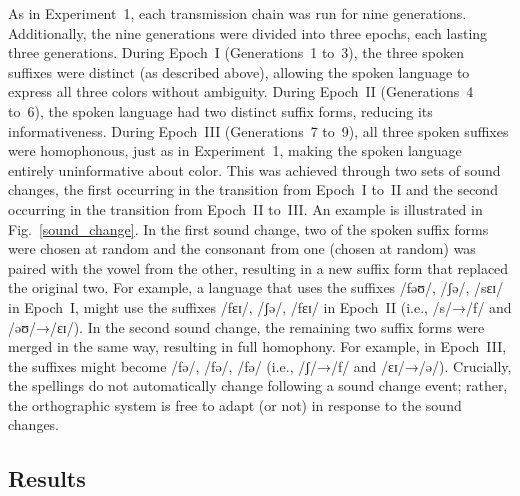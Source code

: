 \documentclass[doc,biblatex]{apa7}
\begin{document}
As in Experiment~1, each transmission chain was run for nine generations. Additionally, the nine generations were divided into three epochs, each lasting three generations. During Epoch~I (Generations~1 to~3), the three spoken suffixes were distinct (as described above), allowing the spoken language to express all three colors without ambiguity. During Epoch~II (Generations~4 to~6), the spoken language had two distinct suffix forms, reducing its informativeness. During Epoch~III (Generations~7 to~9), all three spoken suffixes were homophonous, just as in Experiment~1, making the spoken language entirely uninformative about color. This was achieved through two sets of sound changes, the first occurring in the transition from Epoch~I to~II and the second occurring in the transition from Epoch~II to~III. An example is illustrated in Fig.~\ref{sound_change}. In the first sound change, two of the spoken suffix forms were chosen at random and the consonant from one (chosen at random) was paired with the vowel from the other, resulting in a new suffix form that replaced the original two. For example, a language that uses the suffixes /fəʊ/, /ʃə/, /sɛɪ/ in Epoch~I, might use the suffixes /fɛɪ/, /ʃə/, /fɛɪ/ in Epoch~II (i.e., /s/→/f/ and /əʊ/→/ɛɪ/). In the second sound change, the remaining two suffix forms were merged in the same way, resulting in full homophony. For example, in Epoch~III, the suffixes might become /fə/, /fə/, /fə/ (i.e., /ʃ/→/f/ and /ɛɪ/→/ə/). Crucially, the spellings do not automatically change following a sound change event; rather, the orthographic system is free to adapt (or not) in response to the sound changes.

\subsection{Results}
\end{document}
